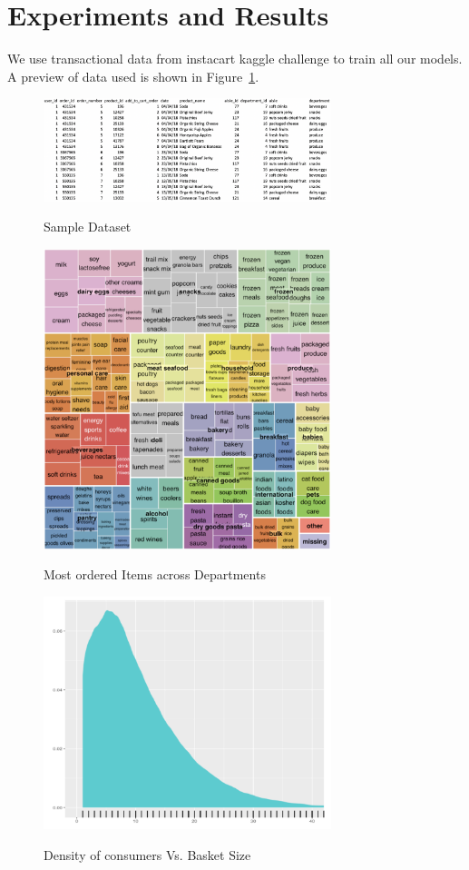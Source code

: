 \section{Experiments and Results}
We use transactional data from instacart kaggle challenge to train all our models. A preview of data used is 
shown in Figure~\ref{fig:sampledata}. 

 \begin{figure}[t]
    \centering 
    \caption{Sample Dataset} 
    \includegraphics[width=3.3in]{img/sampledata.png} 
    \label{fig:sampledata} 
  \end{figure}

  \begin{figure}[t]
    \centering 
    \caption{Most ordered Items across Departments} 
    \includegraphics[width=3.3in]{img/items.png} 
    \label{fig:items} 
  \end{figure}

  \begin{figure}[t]
    \centering 
    \caption{Density of consumers Vs. Basket Size} 
    \includegraphics[width=3.3in]{img/basket.png} 
    \label{fig:basket} 
  \end{figure}

